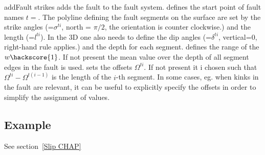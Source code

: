 \begin{methoddesc}[FaultSystem]{addFault}{
strikes}
adds the  fault  to the fault system. 
 defines the start point of fault names $t=$. The polyline
defining the fault segments on the surface are set 
by the strike angles  (=$\sigma^{ti}$, north = $\pi/2$, the orientation is counter clockwise.) and
the length  (=$l^{ti}$). In the 3D one also needs to define the 
dip angles  (=$\delta^{ti}$, vertical=$0$, right-hand rule applies.) and 
the depth  for each segment.
 defines the range of the $w\hackscore{1}$. If not present the mean value over the depth of 
all segment edges in the fault is used.
 sets the offsets $\Omega^{ti}$. If not present it i chosen such that $\Omega^{ti}-\Omega^{t(i-1)}$ is the length of the $i$-th segment. In some cases, eg. when kinks in the fault are relevant, it can be useful
to explicitly specify the offsets in order to simplify the assignment of values.
\end{methoddesc}

\subsection{Example}
See section~\ref{Slip CHAP}







